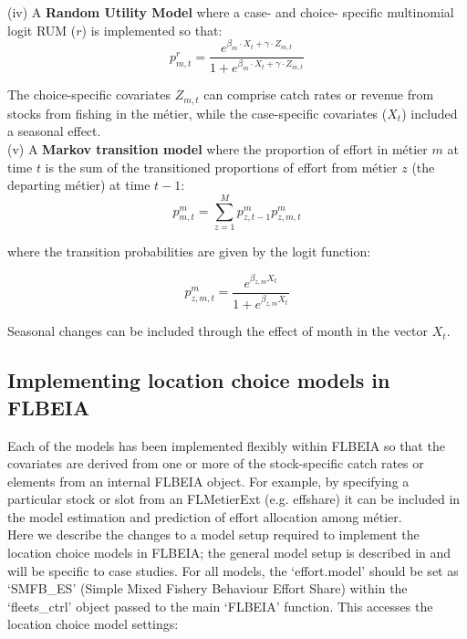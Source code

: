 \documentclass[12pt, halfline, a4paper]{ouparticle}
\begin{document}
(iv) A \textbf{Random Utility Model} where a case- and choice- specific
multinomial logit RUM ($r$) is implemented so that:  
\begin{equation}
p^{r}_{m,t} = \frac{e^{\beta_{m} \cdot X_{t} + \gamma \cdot Z_{m,t}}}{1 + 
	e^{\beta_{m} \cdot X_{t} + \gamma \cdot Z_{m,t}}}
\label{eqn:rum}
\end{equation} 

The choice-specific covariates $Z_{m,t}$ can comprise catch rates or revenue
from stocks from fishing in the métier, while the case-specific covariates
($X_{t}$) included a seasonal effect. \\

(v) A \textbf{Markov transition model} where the proportion of effort in métier
$m$ at time $t$ is the sum of the transitioned proportions of effort from
métier $z$ (the departing métier) at time $t-1$:
\begin{equation}
p^m_{m,t} = \sum_{z = 1}^{M} p^m_{z, t-1} p^m_{z,m,t}
\end{equation}

where the transition probabilities are given by the logit function:

\begin{equation}
p^m_{z,m,t} = \frac{e^{\beta_{z,m} X_{t}}}{1+e^{\beta_{z,m} X_{t}}}
\end{equation}

Seasonal changes can be included through the effect of month in the vector
$X_t$. 

\subsection{Implementing location choice models in FLBEIA}
\label{sec:imp}

Each of the models has been implemented flexibly within FLBEIA so that the
covariates are derived from one or more of the stock-specific catch rates or
elements from an internal FLBEIA object. For example, by specifying a
particular stock or slot from an FLMetierExt (e.g. effshare) it can be included
in the model estimation and prediction of effort allocation among métier. \\

Here we describe the changes to a model setup required to implement the
location choice models in FLBEIA; the general model setup is described in
\cite{Garcia2017a} and will be specific to case studies. For all models, the
`effort.model' should be set as `SMFB\_ES' (Simple Mixed Fishery Behaviour
Effort Share) within the `fleets\_ctrl' object passed to the main `FLBEIA'
function. This accesses the location choice model settings:
\end{document}
